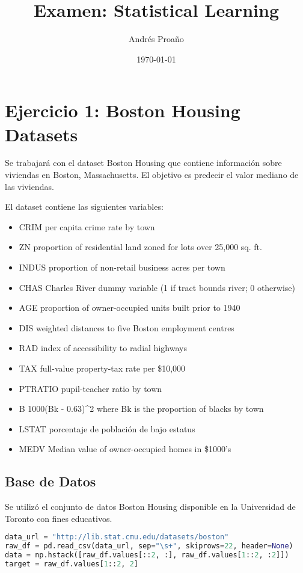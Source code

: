 \documentclass[12pt,a4paper]{article}
\title{\textbf{Examen: Statistical Learning}}
\author{Andrés Proaño}
\date{\today}
\begin{document}
\maketitle

\section{Ejercicio 1: Boston Housing Datasets}

Se trabajará con el dataset Boston Housing que contiene información sobre viviendas en Boston, Massachusetts. El objetivo es predecir el valor mediano de las viviendas.

El dataset contiene las siguientes variables:
\begin{itemize}
\item CRIM     per capita crime rate by town
\item ZN       proportion of residential land zoned for lots over 25,000 sq. ft.
\item INDUS    proportion of non-retail business acres per town
\item CHAS     Charles River dummy variable (1 if tract bounds river; 0 otherwise)
\item  AGE      proportion of owner-occupied units built prior to 1940
\item  DIS      weighted distances to five Boston employment centres
\item  RAD      index of accessibility to radial highways
\item  TAX      full-value property-tax rate per \$10,000
\item  PTRATIO  pupil-teacher ratio by town
\item  B        1000(Bk - 0.63)^2 where Bk is the proportion of blacks by town
\item  LSTAT    porcentaje de población de bajo estatus
\item  MEDV     Median value of owner-occupied homes in \$1000's
\end{itemize}

\subsection{Base de Datos}

Se utilizó el conjunto de datos Boston Housing disponible en la Universidad de Toronto con fines educativos.

\begin{lstlisting}[language=Python, frame=single, basicstyle=\ttfamily\small, breaklines=true]
data_url = "http://lib.stat.cmu.edu/datasets/boston"
raw_df = pd.read_csv(data_url, sep="\s+", skiprows=22, header=None)
data = np.hstack([raw_df.values[::2, :], raw_df.values[1::2, :2]])
target = raw_df.values[1::2, 2]
\end{lstlisting}
\end{document}
